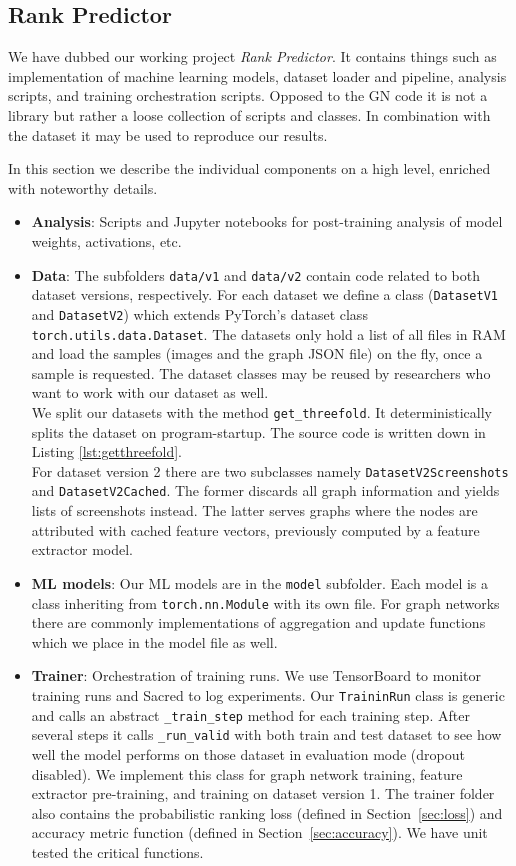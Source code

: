 \subsection{Rank Predictor}

We have dubbed our working project \textit{Rank Predictor}. It contains things such as implementation of machine learning models, dataset loader and pipeline, analysis scripts, and training orchestration scripts. Opposed to the GN code it is not a library but rather a loose collection of scripts and classes. In combination with the dataset it may be used to reproduce our results.

In this section we describe the individual components on a high level, enriched with noteworthy details.

\begin{itemize}
    \item \textbf{Analysis}: Scripts and Jupyter notebooks for post-training analysis of model weights, activations, etc.
    \item \textbf{Data}: The subfolders \texttt{data/v1} and \texttt{data/v2} contain code related to both dataset versions, respectively. For each dataset we define a class (\texttt{DatasetV1} and \texttt{DatasetV2}) which extends PyTorch's dataset class \texttt{torch.utils.data.Dataset}. The datasets only hold a list of all files in RAM and load the samples (images and the graph JSON file) on the fly, once a sample is requested. The dataset classes may be reused by researchers who want to work with our dataset as well.\\
    We split our datasets with the method \texttt{get\_threefold}. It deterministically splits the dataset on program-startup. The source code is written down in Listing \ref{lst:getthreefold}.\\
    For dataset version 2 there are two subclasses namely \texttt{DatasetV2Screenshots} and \texttt{DatasetV2Cached}. The former discards all graph information and yields lists of screenshots instead. The latter serves graphs where the nodes are attributed with cached feature vectors, previously computed by a feature extractor model.
    \item \textbf{ML models}: Our ML models are in the \texttt{model} subfolder. Each model is a class inheriting from \texttt{torch.nn.Module} with its own file. For graph networks there are commonly implementations of aggregation and update functions which we place in the model file as well.
    \item \textbf{Trainer}: Orchestration of training runs. We use TensorBoard to monitor training runs and Sacred to log experiments. Our \texttt{TraininRun} class is generic and calls an abstract \texttt{\_train\_step} method for each training step. After several steps it calls \texttt{\_run\_valid} with both train and test dataset to see how well the model performs on those dataset in evaluation mode (dropout disabled). We implement this class for graph network training, feature extractor pre-training, and training on dataset version 1. The trainer folder also contains the probabilistic ranking loss (defined in Section~\ref{sec:loss}) and accuracy metric function (defined in Section~\ref{sec:accuracy}). We have unit tested the critical functions.
\end{itemize}
